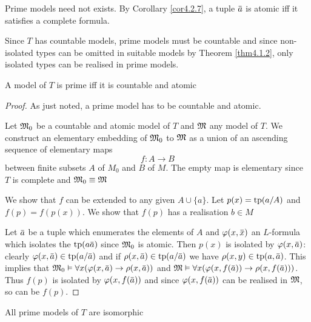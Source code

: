 \documentclass[11pt]{article}
\begin{document}
Prime models need not exists. By Corollary \ref{cor4.2.7}, a tuple \(\bara\) is atomic iff it
satisfies a complete formula.

Since \(T\) has countable models, prime models must be countable and since non-isolated types
can be omitted in suitable models by Theorem \ref{thm4.1.2}, only isolated types can be realised
in prime models.

\begin{theorem}[]
\label{thm4.5.2}
A model of \(T\) is prime iff it is countable and atomic
\end{theorem}

\begin{proof}
As just noted, a prime model has to be countable and atomic.

Let \(\mathfrak{M}_0\) be a countable and atomic model of \(T\) and \(\mathfrak{M}\) any model of \(T\). We construct
an elementary embedding of \(\mathfrak{M}_0\) to \(\mathfrak{M}\) as a union of an ascending sequence of elementary
maps
\begin{equation*}
f:A\to B
\end{equation*}
between finite subsets \(A\) of \(M_0\) and \(B\) of \(M\). The empty map is elementary
since \(T\) is complete and \(\mathfrak{M}_0\equiv\mathfrak{M}\)

We show that \(f\) can be extended to any given \(A\cup\{a\}\). Let \(p(x)=\operatorname{tp}(a/A)\)
and \(f(p)=f(p(x))\). We show that \(f(p)\) has a realisation \(b\in M\)

Let \(\bara\) be a tuple which enumerates the elements of \(A\) and \(\varphi(x,\barx)\)
an \(L\)-formula which isolates the \(\tp(a\bara)\) since \(\mathfrak{M}_0\) is atomic. Then \(p(x)\) is
isolated by \(\varphi(x,\bara)\): clearly \(\varphi(x,\bara)\in\tp(a/\bara)\) and
if \(\rho(x,\bara)\in\tp(a/\bara)\) we have  \(\rho(x,y)\in\tp(a,\bara)\). This implies
that \(\fM_0\vDash\forall x(\varphi(x,\bara)\to\rho(x,\bara))\) and \(\fM\vDash\forall x(\varphi(x,f(\bara))\to\rho(x,f(\bara)))\). Thus \(f(p)\) is
isolated by \(\varphi(x,f(\bara))\) and since \(\varphi(x,f(\bara))\) can be realised in \(\mathfrak{M}\), so can
be \(f(p)\).
\end{proof}

\begin{theorem}[]
\label{thm4.5.3}
All prime models of \(T\) are isomorphic
\end{theorem}
\end{document}
